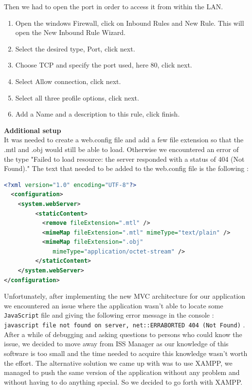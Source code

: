 \documentclass{scrbook}
\begin{document}
Then we had to open the port in order to access it from within the LAN.
\begin{enumerate}
  \item Open the windows Firewall, click on Inbound Rules and New Rule. This will open the New Inbound Rule Wizard.
  \item Select the desired type, Port, click next.
  \item Choose TCP and specify the port used, here 80, click next.
  \item Select Allow connection, click next.
  \item Select all three profile options, click next.
  \item Add a Name and a description to this rule, click finish.
\end{enumerate}

\textbf{Additional setup}\\

It was needed to create a web.config file and add a few file extension so that the .mtl and .obj would still be able to load. 
Otherwise we encountered an error of the type "Failed to load resource: the server responded with a status of 404 (Not Found)." 
The text that needed to be added to the web.config file is the following : 

\begin{lstlisting}[language=XML, basicstyle=\ttfamily\small]
<?xml version="1.0" encoding="UTF-8"?>
  <configuration>
    <system.webServer>
         <staticContent>
           <remove fileExtension=".mtl" />
           <mimeMap fileExtension=".mtl" mimeType="text/plain" />
           <mimeMap fileExtension=".obj" 
              mimeType="application/octet-stream" />
         </staticContent>
    </system.webServer>
</configuration>
\end{lstlisting}

Unfortunately, after implementing the new MVC architecture for our application we encountered an issue where the application wasn't able to locate some \texttt{JavaScript} file and giving the following error message in the console : 
\texttt{javascript file not found on server, net::ERR\textunderscore ABORTED 404 (Not Found)} .  After a while of debugging and asking questions to persons who could know the issue, 
we decided to move away from ISS Manager as our knowledge of this software is too small and the time needed to acquire this knowledge wasn't worth the effort. 
The alternative solution we came up with was to use XAMPP, we managed to push the same version of the application without any problem and without having to do anything special. So we decided to go forth with XAMPP.
\end{document}
